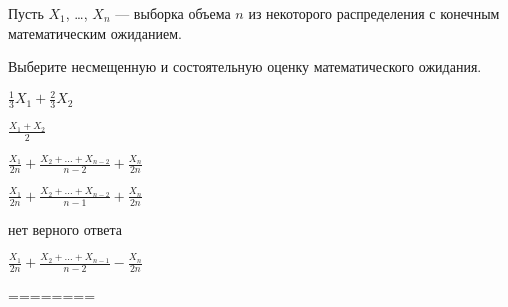 
\begin{question}
Пусть \(X_1\), \ldots, \(X_n\) --- выборка объема \(n\) из некоторого
распределения с конечным математическим ожиданием.

Выберите несмещенную и состоятельную оценку математического ожидания.
\begin{answerlist}
  \item \(\frac{1}{3} X_1 + \frac{2}{3} X_2\)
  \item \(\frac{X_1+X_2}{2}\)
  \item \(\frac{X_1}{2 n}+\frac{X_2+\ldots+X_{n-2}}{n-2}+\frac{X_n}{2 n}\)
  \item \(\frac{X_1}{2 n}+\frac{X_2+\ldots+X_{n-2}}{n-1}+\frac{X_n}{2 n}\)
  \item нет верного ответа
  \item \(\frac{X_1}{2 n}+\frac{X_2+\ldots+X_{n-1}}{n-2}-\frac{X_n}{2 n}\)
\end{answerlist}
\end{question}

\begin{solution}
========
\end{solution}

